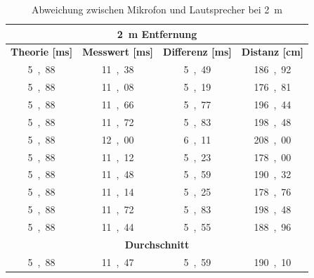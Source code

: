 \begin{table}[H]
\centering
\caption{Abweichung zwischen Mikrofon und Lautsprecher bei \SI{2}{m}}
\label{tab:modul_D_2}
\begin{tabular}{|c|c|c|c|}
\hline
\multicolumn{4}{|c|}{\textbf{\SI{2}{\m} Entfernung}} \\ \hline
\textbf{Theorie [\si{ms}]} & \textbf{Messwert [\si{ms}]} & \multicolumn{1}{l|}{\textbf{Differenz [\si{ms}]}} & \multicolumn{1}{l|}{\textbf{Distanz [\si{cm}]}} \\ \hline
\si{5,88} & \si{11,38} & \si{5,49} & \si{186,92} \\ \hline
\si{5,88} & \si{11,08} & \si{5,19} & \si{176,81} \\ \hline
\si{5,88} & \si{11,66} & \si{5,77} & \si{196,44} \\ \hline
\si{5,88} & \si{11,72} & \si{5,83} & \si{198,48} \\ \hline
\si{5,88} & \si{12,00} & \si{6,11} & \si{208,00} \\ \hline
\si{5,88} & \si{11,12} & \si{5,23} & \si{178,00} \\ \hline
\si{5,88} & \si{11,48} & \si{5,59} & \si{190,32} \\ \hline
\si{5,88} & \si{11,14} & \si{5,25} & \si{178,76} \\ \hline
\si{5,88} & \si{11,72} & \si{5,83} & \si{198,48} \\ \hline
\si{5,88} & \si{11,44} & \si{5,55} & \si{188,96} \\ \hline
\multicolumn{4}{|c|}{\textbf{Durchschnitt}} \\ \hline
\si{5,88} & \si{11,47} & \si{5,59} & \si{190,10} \\ \hline
\end{tabular}
\end{table}

